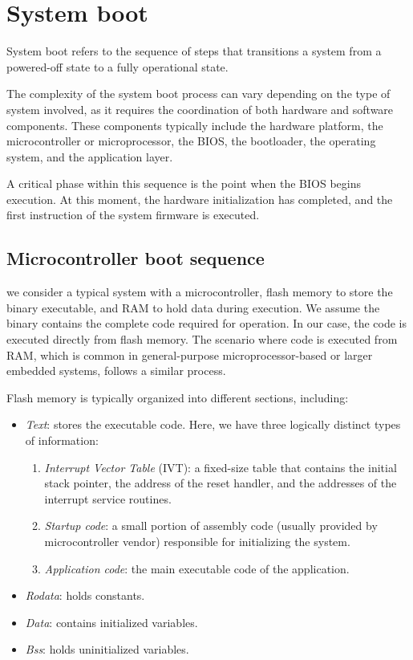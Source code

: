 \section{System boot}

\begin{definition}
    System boot refers to the sequence of steps that transitions a system from a powered-off state to a fully operational state.
\end{definition}
The complexity of the system boot process can vary depending on the type of system involved, as it requires the coordination of both hardware and software components.
These components typically include the hardware platform, the microcontroller or microprocessor, the BIOS, the bootloader, the operating system, and the application layer.

A critical phase within this sequence is the point when the BIOS begins execution.
At this moment, the hardware initialization has completed, and the first instruction of the system firmware is executed.

\subsection{Microcontroller boot sequence}
we consider a typical system with a microcontroller, flash memory to store the binary executable, and RAM to hold data during execution. 
We assume the binary contains the complete code required for operation.
In our case, the code is executed directly from flash memory. 
The scenario where code is executed from RAM, which is common in general-purpose microprocessor-based or larger embedded systems, follows a similar process.

Flash memory is typically organized into different sections, including:
\begin{itemize}
    \item \textit{Text}: stores the executable code.
        Here, we have three logically distinct types of information:
        \begin{enumerate}
            \item \textit{Interrupt Vector Table} (IVT): a fixed-size table that contains the initial stack pointer, the address of the reset handler, and the addresses of the interrupt service routines.
            \item \textit{Startup code}: a small portion of assembly code (usually provided by microcontroller vendor) responsible for initializing the system.
            \item \textit{Application code}: the main executable code of the application.
        \end{enumerate}
    \item \textit{Rodata}: holds constants.
    \item \textit{Data}: contains initialized variables.
    \item \textit{Bss}: holds uninitialized variables.
\end{itemize}


